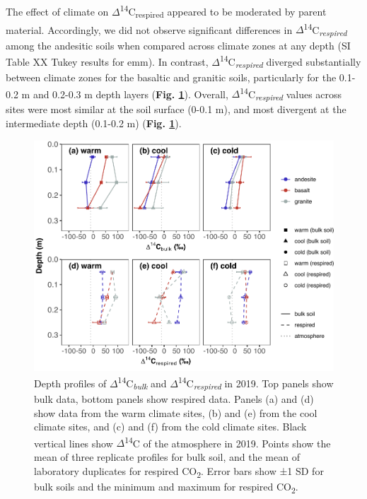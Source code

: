 \documentclass[english,man,floatsintext]{apa6}
\begin{document}
The effect of climate on \(\Delta\)\textsuperscript{14}C\textsubscript{respired} appeared to be moderated by parent material. Accordingly, we did not observe significant differences in \(\Delta\)\textsuperscript{14}C\textsubscript{\emph{respired}} among the andesitic soils when compared across climate zones at any depth (SI Table XX Tukey results for emm). In contrast, \(\Delta\)\textsuperscript{14}C\textsubscript{\emph{respired}} diverged substantially between climate zones for the basaltic and granitic soils, particularly for the 0.1-0.2 m and 0.2-0.3 m depth layers (\textbf{Fig. \ref{fig:blk-inc-pro-19}}). Overall, \(\Delta\)\textsuperscript{14}C\textsubscript{\emph{respired}} values across sites were most similar at the soil surface (0-0.1 m), and most divergent at the intermediate depth (0.1-0.2 m) (\textbf{Fig. \ref{fig:blk-inc-pro-19}}).



\begin{figure}

{\centering \includegraphics{sra-blk-inc-19_files/figure-latex/blk-inc-pro-19-1} 

}

\caption{Depth profiles of \(\Delta\)\textsuperscript{14}C\textsubscript{\emph{bulk}} and \(\Delta\)\textsuperscript{14}C\textsubscript{\emph{respired}} in 2019. Top panels show bulk data, bottom panels show respired data. Panels (a) and (d) show data from the warm climate sites, (b) and (e) from the cool climate sites, and (c) and (f) from the cold climate sites. Black vertical lines show \(\Delta\)\textsuperscript{14}C of the atmosphere in 2019. Points show the mean of three replicate profiles for bulk soil, and the mean of laboratory duplicates for respired CO\textsubscript{2}. Error bars show ±1 SD for bulk soils and the minimum and maximum for respired CO\textsubscript{2}.}\label{fig:blk-inc-pro-19}
\end{figure}
\end{document}
